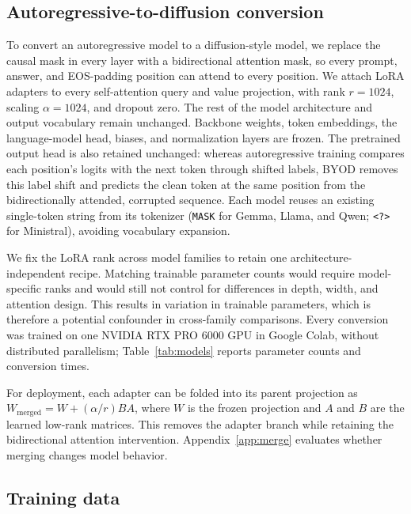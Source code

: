 \documentclass{article}
\begin{document}
\subsection{Autoregressive-to-diffusion conversion}

To convert an autoregressive model to a diffusion-style model, we replace the causal mask in every layer with a bidirectional attention mask, so every prompt, answer, and EOS-padding position can attend to every position. We attach LoRA adapters to every self-attention query and value projection, with rank $r=1024$, scaling $\alpha=1024$, and dropout zero. The rest of the model architecture and output vocabulary remain unchanged. Backbone weights, token embeddings, the language-model head, biases, and normalization layers are frozen. The pretrained output head is also retained unchanged: whereas autoregressive training compares each position’s logits with the next token through shifted labels, BYOD removes this label shift and predicts the clean token at the same position from the bidirectionally attended, corrupted sequence. Each model reuses an existing single-token string from its tokenizer (\texttt{MASK} for Gemma, Llama, and Qwen; \texttt{<?>} for Ministral), avoiding vocabulary expansion.

We fix the LoRA rank across model families to retain one architecture-independent recipe. Matching trainable parameter counts would require model-specific ranks and would still not control for differences in depth, width, and attention design. This results in variation in trainable parameters, which is therefore a potential confounder in cross-family comparisons. Every conversion was trained on one NVIDIA RTX PRO 6000 GPU in Google Colab, without distributed parallelism; Table~\ref{tab:models} reports parameter counts and conversion times.

For deployment, each adapter can be folded into its parent projection as $W_{\mathrm{merged}}=W+(\alpha/r)BA$, where $W$ is the frozen projection and $A$ and $B$ are the learned low-rank matrices. This removes the adapter branch while retaining the bidirectional attention intervention. Appendix~\ref{app:merge} evaluates whether merging changes model behavior.

\subsection{Training data}
\end{document}
